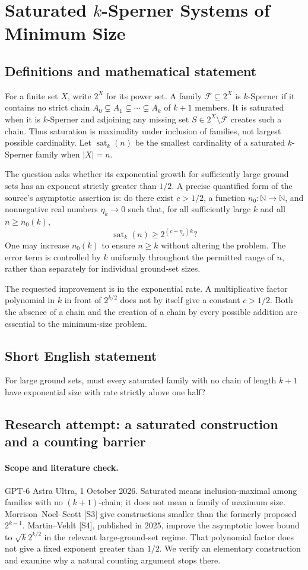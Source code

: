 \documentclass[11pt,a4paper]{article}
\begin{document}
\section*{Saturated $k$-Sperner Systems of Minimum Size}\label{statement}

\subsection{Definitions and mathematical statement}
For a finite set $X$, write $2^X$ for its power set. A family
$\mathcal F\subseteq2^X$ is $k$-Sperner if it contains no strict chain
$A_0\subsetneq A_1\subsetneq\cdots\subsetneq A_k$ of $k+1$ members.
It is saturated when it is $k$-Sperner and adjoining any missing set
$S\in2^X\setminus\mathcal F$ creates such a chain. Thus saturation is
maximality under inclusion of families, not largest possible cardinality.
Let $\operatorname{sat}_k(n)$ be the smallest cardinality of a saturated
$k$-Sperner family when $|X|=n$.

The question asks whether its exponential growth for sufficiently large
ground sets has an exponent strictly greater than $1/2$. A precise
quantified form of the source's asymptotic assertion is: do there exist
$c>1/2$, a function $n_0:\mathbb N\to\mathbb N$, and nonnegative real
numbers $\eta_k\to0$ such that, for all sufficiently large $k$ and all
$n\ge n_0(k)$,
\[
 \operatorname{sat}_k(n)\ge 2^{(c-\eta_k)k}?
\]
One may increase $n_0(k)$ to ensure $n\ge k$ without altering the problem.
The error term is controlled by $k$ uniformly throughout the permitted
range of $n$, rather than separately for individual ground-set sizes.

The requested improvement is in the exponential rate. A multiplicative
factor polynomial in $k$ in front of $2^{k/2}$ does not by itself give a
constant $c>1/2$. Both the absence of a chain and the creation of a chain
by every possible addition are essential to the minimum-size problem.
\subsection{Short English statement}
For large ground sets, must every saturated family with no chain of length $k+1$ have exponential size with rate strictly above one half?
\subsection{Research attempt: a saturated construction and a counting barrier}
\paragraph{Scope and literature check.}
GPT-6 Astra Ultra, 1 October 2026. Saturated means inclusion-maximal
among families with no $(k+1)$-chain; it does not mean a family of
maximum size. Morrison--Noel--Scott [S3] give constructions smaller
than the formerly proposed $2^{k-1}$. Martin--Veldt [S4], published
in 2025, improve the asymptotic lower bound to $\sqrt{k}2^{k/2}$
in the relevant large-ground-set regime. That polynomial factor does
not give a fixed exponent greater than $1/2$. We verify an elementary
construction and examine why a natural counting argument stops there.
\end{document}
